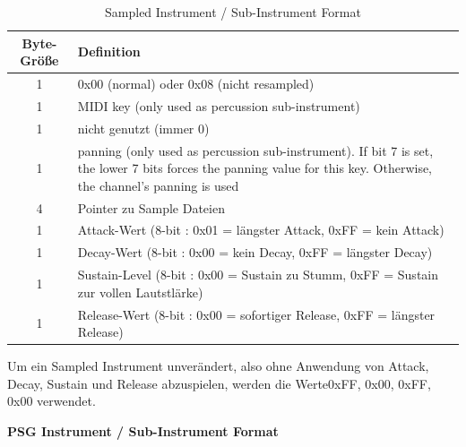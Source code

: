 \documentclass[11pt,a4paper]{scrartcl}
\begin{document}
\begin{table}[h]
    \centering
    \begin{tabular}{ c | p{15cm} }
        \textbf{Byte-Gr\"{o}{\ss}e} & \textbf{Definition} \\
        \hline
				1 & 0x00 (normal) oder 0x08 (nicht resampled) \\
				\hline
        1 & MIDI key (only used as percussion sub-instrument) \\
				\hline
        1 & nicht genutzt (immer 0) \\
				\hline
        1 & panning (only used as percussion sub-instrument).
         If bit 7 is set, the lower 7 bits forces the panning value for this key. Otherwise, the channel's panning is used \\
				\hline
        4 & Pointer zu Sample Dateien \\
				\hline
				1 & Attack-Wert (8-bit : 0x01 = l\"{a}ngster Attack, 0xFF = kein Attack) \\
        \hline
        1 & Decay-Wert (8-bit : 0x00 = kein Decay, 0xFF = l\"{a}ngster Decay) \\ 
        \hline
				1 & Sustain-Level (8-bit : 0x00 = Sustain zu Stumm, 0xFF = Sustain zur vollen Lautstl\"{a}rke) \\
        \hline
        1 & Release-Wert (8-bit : 0x00 = sofortiger Release, 0xFF = l\"{a}ngster Release) \\
    \end{tabular}
    \caption{Sampled Instrument / Sub-Instrument Format}
    \label{table:SampleInstrument}
\end{table}

Um ein Sampled Instrument unver\"{a}ndert, also ohne Anwendung von Attack, Decay, Sustain und Release abzuspielen, werden die Werte0xFF, 0x00, 0xFF, 0x00 verwendet.
\newpage

\textbf{{\large PSG Instrument / Sub-Instrument Format}}
\end{document}
